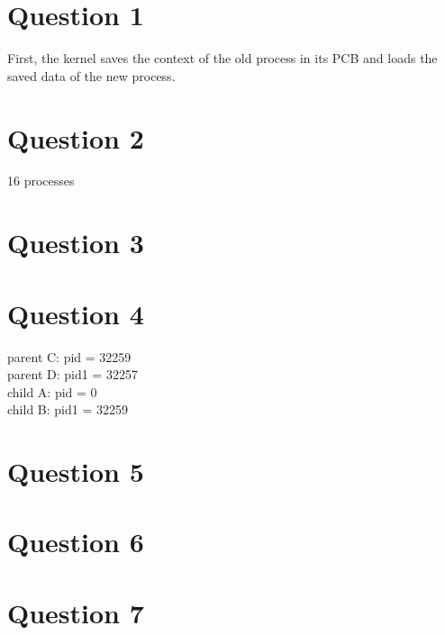 \documentclass[11pt]{article}
\begin{document}
\maketitle


\section*{Question 1}
    First, the kernel saves the context of the old process
    in its PCB and loads the saved data of the new process.
\section*{Question 2}
16 processes
\section*{Question 3}

\section*{Question 4}
parent C: pid = 32259\\
parent D: pid1 = 32257\\
child A: pid = 0\\
child B: pid1 = 32259\\
\section*{Question 5}

\section*{Question 6}


\section*{Question 7}
\end{document}
